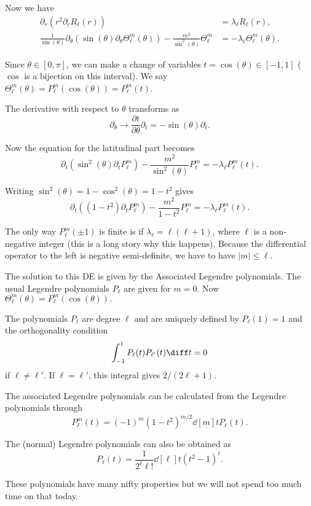\begin{frame}
	Now we have
	\[  
	\begin{split}
		\partial_r \left(r^2 \partial_r R_\ell (r)  \right) &= \lambda_\ell R_\ell (r), \\ 
		\frac{1}{\sin(\theta)} \partial_\theta \left( \sin(\theta) \partial_\theta \Theta_\ell^{m} (\theta)  \right)  - \frac{m^2}{\sin^2(\theta)}\Theta_\ell^{m} &= - \lambda_\ell \Theta_\ell^{m} (\theta).
	\end{split}
	\]
	
	\pause
	Since $ \theta \in [0,\pi] $, we can make a change of variables $ t = \cos(\theta) \in [-1,1] $ ($ \cos $ is a bijection on this interval). We say $ \Theta_\ell^{m} (\theta) = P_\ell^{m} (\cos(\theta)) = P_\ell^{m} (t)$.
	
	\pause
	The derivative with respect to $ \theta $ transforms as 
	$$ \partial_\theta \to \frac{\partial t}{\partial \theta} \partial_t = -\sin(\theta) \partial_t. $$ 
	
	\pause
	Now the equation for the latitudinal part becomes 
	\[ \partial_t \left(\sin^2(\theta) \partial_t P_\ell^{m} \right) - \frac{m^2}{\sin^2(\theta)} P_\ell^{m} = -\lambda_\ell P_\ell^{m} (t).  \]
\end{frame}

\begin{frame}
	Writing $ \sin^2(\theta) = 1-\cos^2(\theta) = 1-t^2 $ gives
	\[ \partial_t \left((1-t^2) \partial_t P_\ell^{m} \right) - \frac{m^2}{1-t^2} P_\ell^{m} = -\lambda_\ell P_\ell^{m} (t).  \]
	
	\pause
	The only way $ P_\ell^{m}(\pm 1) $ is finite is if $ \lambda_\ell = \ell (\ell+1) $, where $ \ell  $  is a non-negative integer (this is a long story why this happens). Because the differential operator to the left is negative semi-definite, we have to have $ |m| \leq \ell $.
	
	\pause
	The solution to this DE is given by the \alert{Associated Legendre polynomials}. The usual Legendre polynomials $ P_\ell $ are given for $ m=0 $. Now $ \Theta_\ell^{m}(\theta) = P_\ell^{m} (\cos(\theta)). $
	
	\pause
	The polynomials $ P_\ell $ are degree $ \ell $ and are uniquely defined by $ P_\ell (1) = 1 $ and the orthogonality condition 
	\[ \int_{-1}^{1} P_\ell (t) P_{\ell'} (t) \diff t = 0 \]
	if $ \ell \neq \ell' $. If $ \ell = \ell' $, this integral gives $ 2/(2\ell + 1) $.
\end{frame}

\begin{frame}
	The associated Legendre polynomials can be calculated from the Legendre polynomials through
	\[ P_\ell^{m}(t) = (-1)^m (1 - t^2 )^{m/2} \dd[m]{}{t} P_\ell (t). \]
	
	\pause
	The (normal) Legendre polynomials can also be obtained as 
	\[ P_\ell (t) = \frac{1}{2^{\ell} \ell! } \dd[\ell]{}{t} (t^2 -1)^{\ell}. \]
	
	\pause
	These polynomials have many nifty properties but we will not spend too much time on that today.
	
\end{frame}

